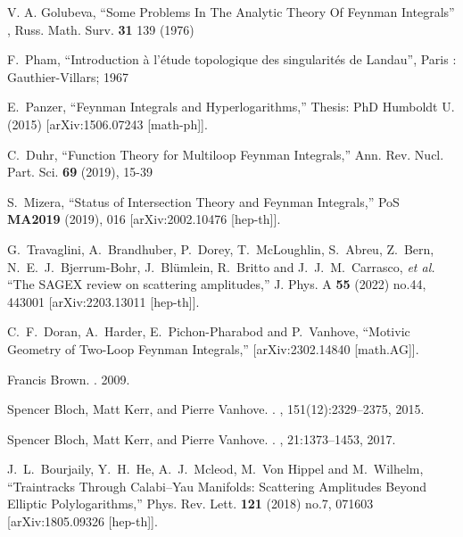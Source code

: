 \documentclass[a4paper,12pt]{article}
\numberwithin{equation}{section}
\numberwithin{figure}{section}
\begin{document}
\begin{thebibliography}{99}


  
 V. A. Golubeva, ``Some Problems In The Analytic
  Theory Of Feynman Integrals'' , Russ. Math. Surv. {\bf 31} 139 (1976)

 F.~Pham, ``Introduction \`a l'\'etude topologique des
  singularit\'es de Landau'', Paris : Gauthier-Villars; 1967

E.~Panzer,
``Feynman Integrals and Hyperlogarithms,''
Thesis: PhD Humboldt U. (2015)
[arXiv:1506.07243 [math-ph]].

C.~Duhr,
``Function Theory for Multiloop Feynman Integrals,''
Ann. Rev. Nucl. Part. Sci. \textbf{69} (2019), 15-39

S.~Mizera,
``Status of Intersection Theory and Feynman Integrals,''
PoS \textbf{MA2019} (2019), 016
[arXiv:2002.10476 [hep-th]].

G.~Travaglini, A.~Brandhuber, P.~Dorey, T.~McLoughlin, S.~Abreu, Z.~Bern, N.~E.~J.~Bjerrum-Bohr, J.~Bl\"umlein, R.~Britto and J.~J.~M.~Carrasco, \textit{et al.}
``The SAGEX review on scattering amplitudes,''
J. Phys. A \textbf{55} (2022) no.44, 443001
[arXiv:2203.13011 [hep-th]].

C.~F.~Doran, A.~Harder, E.~Pichon-Pharabod and P.~Vanhove,
``Motivic Geometry of Two-Loop Feynman Integrals,''
[arXiv:2302.14840 [math.AG]].


Francis Brown.
.
 2009.
\newblock [arXiv:0910.0114]  

Spencer Bloch, Matt Kerr, and Pierre Vanhove.
.
, 151(12):2329--2375, 2015.
\newblock [arXiv:1406.2664] 

Spencer Bloch, Matt Kerr, and Pierre Vanhove.
.
, 21:1373--1453, 2017.
\newblock [arXiv:1601.08181]

J.~L.~Bourjaily, Y.~H.~He, A.~J.~Mcleod, M.~Von Hippel and M.~Wilhelm,
``Traintracks Through Calabi--Yau Manifolds: Scattering Amplitudes Beyond Elliptic Polylogarithms,''
Phys. Rev. Lett. \textbf{121} (2018) no.7, 071603
[arXiv:1805.09326 [hep-th]].
  


\end{thebibliography}
\end{document}
